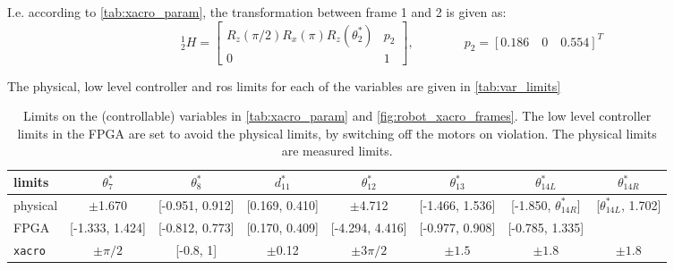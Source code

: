 I.e. according to \autoref{tab:xacro_param}, the transformation between frame 1 and 2 is given as:
\begin{equation}
^1_2H = 
\begin{bmatrix}
R_z(\pi/2)R_x(\pi)R_z(\theta_2^*) & p_2\\
0 & 1
\end{bmatrix}, \qquad\qquad
p_2 = [0.186 \quad 0 \quad 0.554]^T
\end{equation}

The physical, low level controller and \gls{ros} limits for each of the variables are given in \autoref{tab:var_limits}

\vspace{2mm}
\begin{table}[htbp]
\small
\hspace*{-9mm}
\begin{tabular}{l | ccccccc}\hline
limits & $\theta_7^*$ & $\theta_8^*$ & $d_{11}^*$ & $\theta_{12}^*$ & $\theta_{13}^*$ & $\theta_{14L}^*$ & $\theta_{14R}^*$ \\\hline
physical & $\pm$1.670 & [-0.951, 0.912] & [0.169, 0.410] & $\pm$4.712 & [-1.466, 1.536] & [-1.850, $\theta_{14R}^*$] & [$\theta_{14L}^*$, 1.702] \\
FPGA & [-1.333, 1.424] & [-0.812, 0.773] & [0.170, 0.409] & [-4.294, 4.416] & [-0.977, 0.908] & [-0.785, 1.335] & \\
\texttt{xacro} & $\pm\pi/2$ & [-0.8, 1] & $\pm$0.12 & $\pm3\pi/2$ & $\pm 1.5$ & $\pm 1.8$ & $\pm 1.8$
\end{tabular}
\normalsize
\caption{Limits on the (controllable) variables in \autoref{tab:xacro_param} and \autoref{fig:robot_xacro_frames}. The low level controller limits in the FPGA are set to avoid the physical limits, by switching off the motors on violation. The physical limits are measured limits.}
\label{tab:var_limits}
\end{table}
\vspace{2mm}

